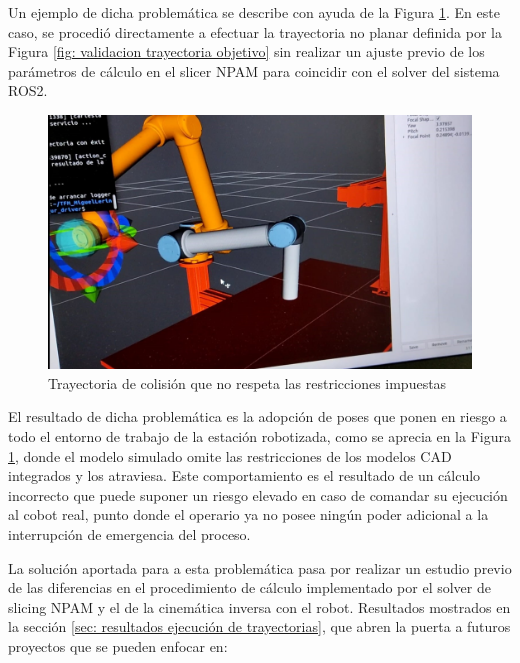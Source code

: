 Un ejemplo de dicha problemática se describe con ayuda de la Figura \ref{fig: problematica ejecucion trayectoria}. En este caso, se procedió directamente a efectuar la trayectoria no planar definida por la Figura \ref{fig: validacion trayectoria objetivo} sin realizar un ajuste previo de los parámetros de cálculo en el slicer \acrshort{NPAM} para coincidir con el solver del sistema ROS2.

\begin{figure}[H]
    \centering
    \includegraphics[scale=0.25]{figuras/problematica ejecucion trayectoria.jpeg}
    \caption{Trayectoria de colisión que no respeta las restricciones impuestas}
    \label{fig: problematica ejecucion trayectoria}
\end{figure}

El resultado de dicha problemática es la adopción de poses que ponen en riesgo a todo el entorno de trabajo de la estación robotizada, como se aprecia en la Figura \ref{fig: problematica ejecucion trayectoria}, donde el modelo simulado omite las restricciones de los modelos \acrshort{CAD} integrados y los atraviesa. Este comportamiento es el resultado de un cálculo incorrecto que puede suponer un riesgo elevado en caso de comandar su ejecución al cobot real, punto donde el operario ya no posee ningún poder adicional a la interrupción de emergencia del proceso.

La solución aportada para a esta problemática pasa por realizar un estudio previo de las diferencias en el procedimiento de cálculo implementado por el solver de slicing \acrshort{NPAM} y el de la cinemática inversa con el robot. Resultados mostrados en la sección \ref{sec: resultados ejecución de trayectorias}, que abren la puerta a futuros proyectos que se pueden enfocar en:

